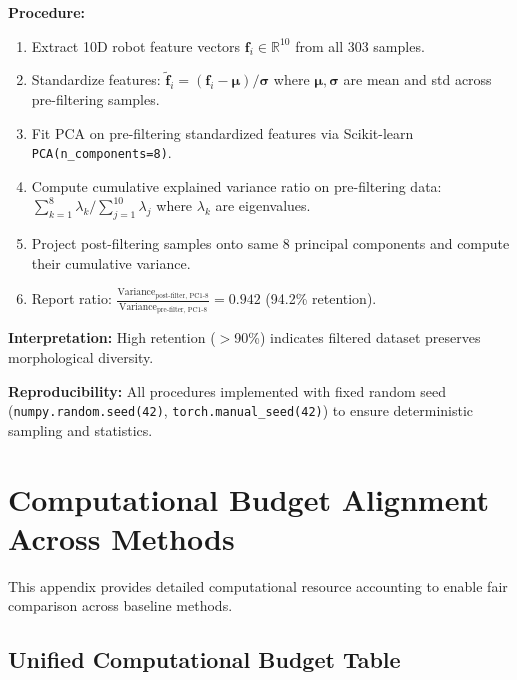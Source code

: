 \documentclass[DTMColor]{ROB-New}
\begin{document}
\textbf{Procedure:}
\begin{enumerate}[leftmargin=*, itemsep=1pt]
    \item Extract 10D robot feature vectors $\mathbf{f}_i \in \mathbb{R}^{10}$ from all 303 samples.
    \item Standardize features: $\tilde{\mathbf{f}}_i = (\mathbf{f}_i - \bm{\mu}) / \bm{\sigma}$ where $\bm{\mu}, \bm{\sigma}$ are mean and std across pre-filtering samples.
    \item Fit PCA on pre-filtering standardized features via Scikit-learn \texttt{PCA(n\_components=8)}.
    \item Compute cumulative explained variance ratio on pre-filtering data: $\sum_{k=1}^{8} \lambda_k / \sum_{j=1}^{10} \lambda_j$ where $\lambda_k$ are eigenvalues.
    \item Project post-filtering samples onto same 8 principal components and compute their cumulative variance.
    \item Report ratio: $\frac{\text{Variance}_{\text{post-filter, PC1-8}}}{\text{Variance}_{\text{pre-filter, PC1-8}}} = 0.942$ (94.2\% retention).
\end{enumerate}

\textbf{Interpretation:} High retention ($>$90\%) indicates filtered dataset preserves morphological diversity.

\textbf{Reproducibility:} All procedures implemented with fixed random seed (\texttt{numpy.random.seed(42)}, \texttt{torch.manual\_seed(42)}) to ensure deterministic sampling and statistics.

\section{Computational Budget Alignment Across Methods}
\label{app:budget_alignment}

This appendix provides detailed computational resource accounting to enable fair comparison across baseline methods.

\subsection{Unified Computational Budget Table}
\end{document}

